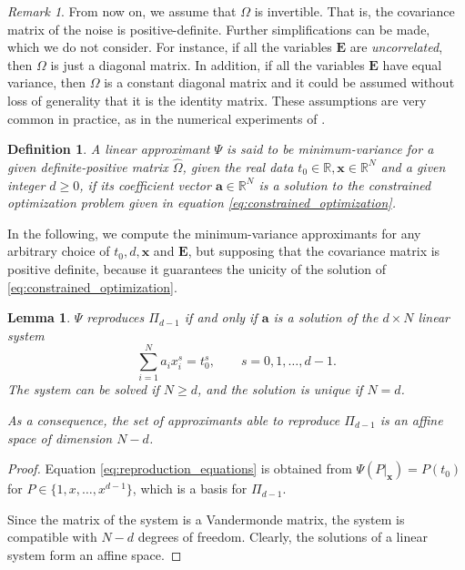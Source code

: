 \documentclass[preprint]{elsarticle}       %
\newcommand{\R}{\mathds{R}}
\newcommand{\ba}{\bm{a}}
\newcommand{\bE}{\bm{E}}
\newcommand{\bx}{\bm{x}}
\theoremstyle{plain}
\newtheorem{lem}[thm]{Lemma}
\newtheorem{defi}[thm]{Definition}
\theoremstyle{remark}
\newtheorem{rmk}[thm]{Remark}
\begin{document}
\begin{rmk}
	From now on, we assume that $\Omega$ is invertible. That is, the covariance matrix of the noise is positive-definite.
	Further simplifications can be made, which we do not consider. For instance, if all the variables $\bE$ are \emph{uncorrelated}, then $\Omega$ is just a diagonal matrix. In addition, if all the variables $\bE$ have equal variance, then $\Omega$ is a constant diagonal matrix and it could be assumed without loss of generality that it is the identity matrix. These assumptions are very common in practice, as in the numerical experiments of \cite{AY13,DHHS15,LUYA}.
\end{rmk}


\begin{defi}
	A linear approximant $\Psi$ is said to be \emph{minimum-variance} for a given definite-positive matrix $\hat \Omega$, given the real data $t_0\in\R,\bx\in\R^N$ and a given integer $d\geq 0$, if its coefficient vector $\ba \in \mathbb{R}^N$ is a solution to the constrained optimization problem given in equation \eqref{eq:constrained_optimization}.
\end{defi}

In the following, we compute the minimum-variance approximants for any arbitrary choice of $t_0,d,\bx$ and $\bE$, but supposing that the covariance matrix is positive definite, because it guarantees the unicity of the solution of \eqref{eq:constrained_optimization}.

\begin{lem} \label{lema:reproduction}
$\Psi$ reproduces $\Pi_{d-1}$ if and only if $\ba$ is a solution of the $d\times N$ linear system
	\begin{equation} \label{eq:reproduction_equations}
		\sum_{i=1}^{N} a_i x_i^s = t_0^s, \qquad s = 0,1,\ldots,d-1.
	\end{equation}
	The system can be solved if $N\geq d$, and the solution is unique if $N=d$.
	
	As a consequence, the set of approximants able to reproduce $\Pi_{d-1}$ is an affine space of dimension $N-d$.
\end{lem}
\begin{proof}
	Equation \eqref{eq:reproduction_equations} is obtained from
$\Psi (P|_{\bx}) = P(t_0)$ for $P\in\{1,x,\ldots,x^{d-1}\}$, which is a basis for $\Pi_{d-1}$.
	
	Since the matrix of the system is a Vandermonde matrix, the system is compatible with $N-d$ degrees of freedom. Clearly, the solutions of a linear system form an affine space.
\end{proof}
\end{document}
